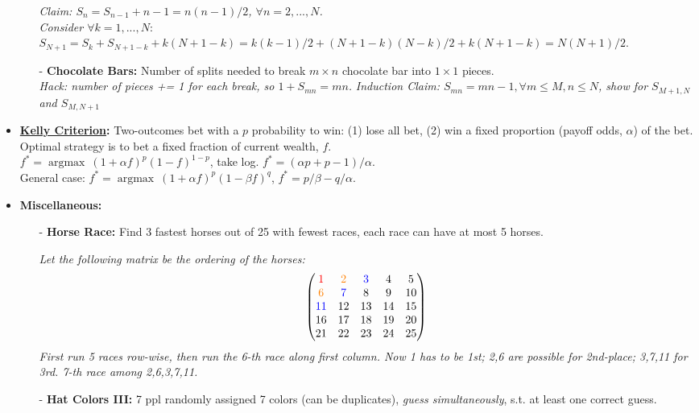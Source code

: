 \documentclass[9pt, landscape]{article}
\DeclareMathOperator*{\argmax}{argmax}
\begin{document}
\begin{multicols*}{3}
\begin{itemize}
\begin{itemize}[leftmargin=10pt,noitemsep,topsep=0pt,partopsep=0pt]
		\textit{Claim: $S_n = S_{n-1} + n-1 = n(n-1)/2$, $\forall n = 2,...,N$. \\
		Consider $\forall k=1,...,N$}: $S_{N+1} = S_{k}+S_{N+1-k} +k(N+1-k) = k(k-1)/2 + (N+1-k)(N-k)/2 + k(N+1-k)= N(N+1)/2$. 
		\item[-] \textbf{Chocolate Bars:} Number of splits needed to break $m\times n$ chocolate bar into $1\times1$ pieces. \\
		\textit{Hack: number of pieces += 1 for each break, so $1+S_{mn}=mn$.} \textit{Induction Claim: $S_{mn}=mn-1, \forall m \leq M, n\leq N$, show for $S_{M+1, N}$ and $S_{M, N+1}$}
	\end{itemize}
	\item \textbf{\href{https://en.wikipedia.org/wiki/Kelly_criterion}{Kelly Criterion}:} Two-outcomes bet with a $p$ probability to win: (1) lose all bet, (2) win a fixed proportion (payoff odds, $\alpha$) of the bet. Optimal strategy is to bet a fixed fraction of current wealth, $f$. \\
	$f^* = \argmax~(1+\alpha f)^{p}(1-f)^{1-p}$, take log. $f^*= (\alpha p + p - 1) / \alpha$. \\
	General case: $f^* = \argmax~(1+\alpha f)^{p}(1-\beta f)^{q}$, $f^*= p/\beta - q/\alpha$.
	\item \textbf{Miscellaneous:}
	\begin{itemize}[leftmargin=10pt,noitemsep,topsep=0pt,partopsep=0pt]
		\item[-] \textbf{Horse Race:} Find 3 fastest horses out of 25 with fewest races, each race can have at most 5 horses.
		{\setlength\multicolsep{0.5pt}
		\begin{multicols*}{2}
		\textit{Let the following matrix be the ordering of the horses:}
		{\scriptsize$$
		\begin{pmatrix}
			\color{red}{1} & \color{orange}{2} & \color{blue}{3} & 4 & 5 \\
			\color{orange}{6} & \color{blue}{7} & 8 & 9 & 10 \\
			\color{blue}{11} & 12 & 13 & 14 & 15 \\
			16 & 17 & 18 & 19 & 20 \\
			21 & 22 & 23 & 24 & 25 \\
		\end{pmatrix}
		$$}
		\textit{First run 5 races row-wise, then run the 6-th race along first column. Now 1 has to be 1st; 2,6 are possible for 2nd-place; 3,7,11 for 3rd. 7-th race among 2,6,3,7,11.}
		\end{multicols*}}
		\item[-] \textbf{Hat Colors III:} 7 ppl randomly assigned 7 colors (can be duplicates), \textit{guess simultaneously}, s.t. at least one correct guess.
	\end{itemize}
\end{itemize}


\end{multicols*}
\end{document}
